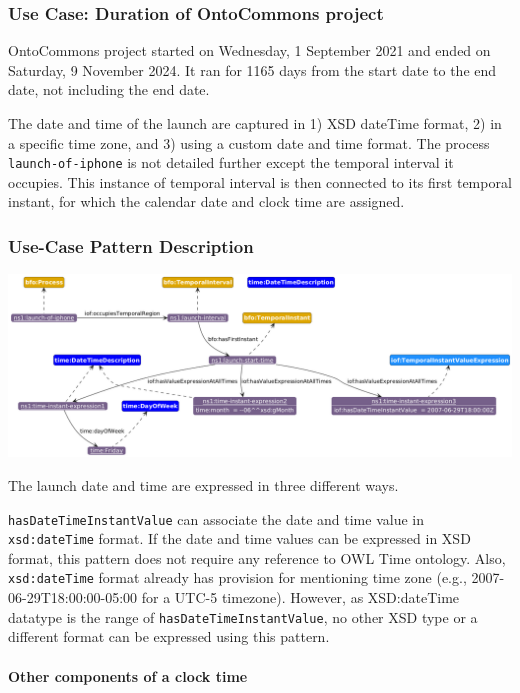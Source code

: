 \subsubsection*{Use Case: Duration of OntoCommons project} 
OntoCommons project started on Wednesday, 1 September 2021 and ended on Saturday, 9 November 2024. It ran for 1165 days from the start date to the end date, not including the end date.

The date and time of the launch are captured in 1) XSD dateTime format, 2) in a specific time zone, and 3) using a custom date and time format. The process \texttt{launch-of-iphone} is not detailed further except the temporal interval it occupies. This instance of temporal interval is then connected to its first temporal instant, for which the calendar date and clock time are assigned.   

\subsubsection*{Use-Case Pattern Description}

\includegraphics[scale=0.35]{scenarios/clock-time-calendar-date/images/uc1-dow-mn.png}

The launch date and time are expressed in three different ways.  

\texttt{hasDateTimeInstantValue} can associate the date and time value in \texttt{xsd:dateTime} format. If the date and time values can be expressed in XSD format, this pattern does not require any reference to OWL Time ontology. Also, \texttt{xsd:dateTime} format already has provision for mentioning time zone (e.g., 2007-06-29T18:00:00-05:00 for a UTC-5 timezone). However, as XSD:dateTime datatype is the range of \texttt{hasDateTimeInstantValue}, no other XSD type or a different format can be expressed using this pattern. 

\paragraph{Other components of a clock time \\}

